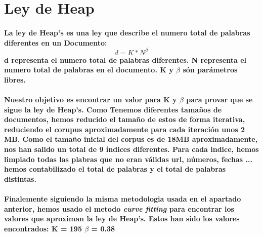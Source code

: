 \documentclass{article}
\begin{document}
\newpage
  \section{Ley de Heap}
    \paragraph{
        La ley de Heap's es una ley que describe el numero total de palabras diferentes en un Documento:
        \newline
        \[d = K*N^{\beta}\]
        \newline
        d representa el numero total de palabras diferentes.
        \newline
        N representa el numero total de palabras en el documento.
        \newline
        K y ${\beta}$ s\'on par\'ametros libres.
    }
    \paragraph{
        Nuestro objetivo es encontrar un valor para K y $\beta$ para provar que se sigue la ley de Heap's.
        \newline
        Como Tenemos diferentes tama\~nos de documentos, hemos reducido el tama\~no de estos de forma iterativa, reduciendo el corupus aproximadamente para cada iteración unos 2 MB. Como el tamaño inicial del corpus es de 18MB aproximadamente, nos han salido un total de 9 \'indices diferentes.
        \newline
        Para cada indice, hemos limpiado todas las plabras que no eran v\'alidas url, n\'umeros, fechas ... hemos contabilizado el total de palabras y el total de palabras distintas.
    }
  \paragraph{
    Finalemente siguiendo la misma metodologia usada en el apartado anterior, hemos usado el metodo \textit{curve fitting}  para encontrar los valores que aproximan la ley de Heap's.
    Estos han sido los valores encontrados:
    K = 195
    $\beta$ = 0.38
  }
  \newpage
\end{document}
